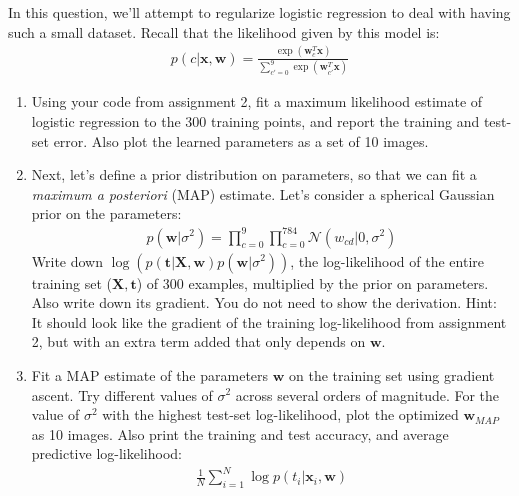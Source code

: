 \documentclass{harvardml}
\newcommand{\bx}{\mathbf{x}}
\newcommand{\bt}{\mathbf{t}}
\newcommand{\bw}{\mathbf{w}}
\newcommand{\bX}{\mathbf{X}}
\newcommand{\N}{\mathcal{N}}
\theoremstyle{plain}
\begin{document}
\begin{problem}

In this question, we'll attempt to regularize logistic regression to deal with having such a small dataset.  Recall that the likelihood given by this model is:
%
\begin{align}
p(c | \bx, \bw) = \frac{\exp(\bw_c^T \bx)}{\sum_{c' = 0}^9 \exp(\bw_{c'}^T \bx)}
\end{align}

\begin{enumerate}[label=(\alph*)]
\item Using your code from assignment 2, fit a maximum likelihood estimate of logistic regression to the 300 training points, and report the training and test-set error.  Also plot the learned parameters as a set of 10 images.
\item Next, let's define a prior distribution on parameters, so that we can fit a \emph{maximum a posteriori} (MAP) estimate.  Let's consider a spherical Gaussian prior on the parameters:
\begin{align}
p(\bw| \sigma^2) = \prod_{c=0}^9 \prod_{c=0}^{784} \N (w_{cd} | 0, \sigma^2)
\end{align}
Write down $\log\left( p(\bt | \bX, \bw) p(\bw | \sigma^2) \right)$, the log-likelihood of the entire training set ($\bX, \bt$) of 300 examples, multiplied by the prior on parameters.
Also write down its gradient.  You do not need to show the derivation.  Hint: It should look like the gradient of the training log-likelihood from assignment 2, but with an extra term added that only depends on $\bw$.
\item Fit a MAP estimate of the parameters $\bw$ on the training set using gradient ascent.  Try different values of $\sigma^2$ across several orders of magnitude.  For the value of $\sigma^2$ with the highest test-set log-likelihood, plot the optimized $\bw_{MAP}$ as 10 images.  Also print the training and test accuracy, and average predictive log-likelihood:
\begin{align}
\frac{1}{N}\sum_{i=1}^N \log p(t_i | \bx_i, \bw)
\end{align}
\end{enumerate}
\end{problem}




\end{document}
